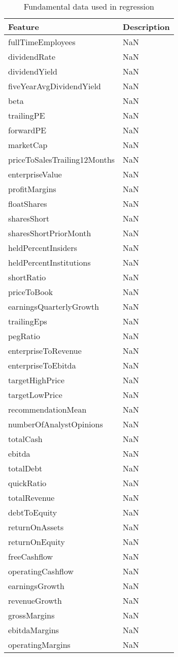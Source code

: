 \begin{table}[H]
\centering
\small
\caption{Fundamental data used in regression}
\label{tab:appendix_D}
\begin{tabular}{ll}
\toprule
Feature & Description \\
\midrule
fullTimeEmployees & NaN \\
dividendRate & NaN \\
dividendYield & NaN \\
fiveYearAvgDividendYield & NaN \\
beta & NaN \\
trailingPE & NaN \\
forwardPE & NaN \\
marketCap & NaN \\
priceToSalesTrailing12Months & NaN \\
enterpriseValue & NaN \\
profitMargins & NaN \\
floatShares & NaN \\
sharesShort & NaN \\
sharesShortPriorMonth & NaN \\
heldPercentInsiders & NaN \\
heldPercentInstitutions & NaN \\
shortRatio & NaN \\
priceToBook & NaN \\
earningsQuarterlyGrowth & NaN \\
trailingEps & NaN \\
pegRatio & NaN \\
enterpriseToRevenue & NaN \\
enterpriseToEbitda & NaN \\
targetHighPrice & NaN \\
targetLowPrice & NaN \\
recommendationMean & NaN \\
numberOfAnalystOpinions & NaN \\
totalCash & NaN \\
ebitda & NaN \\
totalDebt & NaN \\
quickRatio & NaN \\
totalRevenue & NaN \\
debtToEquity & NaN \\
returnOnAssets & NaN \\
returnOnEquity & NaN \\
freeCashflow & NaN \\
operatingCashflow & NaN \\
earningsGrowth & NaN \\
revenueGrowth & NaN \\
grossMargins & NaN \\
ebitdaMargins & NaN \\
operatingMargins & NaN \\
\bottomrule
\end{tabular}
\end{table}
